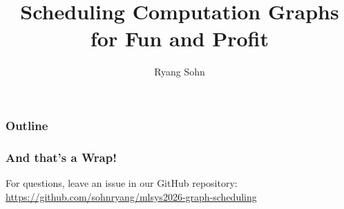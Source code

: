 \documentclass[aspectratio=169,mathserif]{beamer}
\title{Scheduling Computation Graphs for Fun and Profit}
\author{Ryang Sohn}
\institute{Pohang University of Science and Technology}
\begin{document}
\begin{frame}
\maketitle
\end{frame}

\begin{frame}
\frametitle{Outline}
\tableofcontents
\end{frame}






\begin{frame}
\frametitle{And that's a Wrap!}

For questions, leave an issue in our GitHub repository:  \url{https://github.com/sohnryang/mlsys2026-graph-scheduling}
\end{frame}
\end{document}
